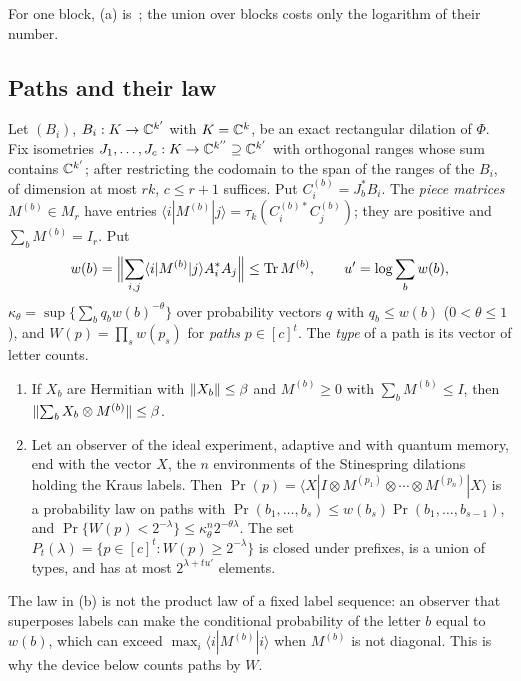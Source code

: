 For one block, (a) is~\cite[Lemma~A.4]{DouglasMghirbiB}; the union over blocks costs only the logarithm of their number.

\subsection{Paths and their law}

Let $(B_i)$, $B_i:K\to\mathbb C^{k'}$ with $K=\mathbb C^k$, be an exact rectangular dilation of $\Phi$. Fix isometries $J_1,\dots,J_c:K\to\mathbb C^{k''}\supseteq\mathbb C^{k'}$
with orthogonal ranges whose sum contains $\mathbb C^{k'}$; after restricting the codomain to the span of the ranges of the $B_i$, of
dimension at most $rk$, $c\le r+1$ suffices. Put $C^{(b)}_i=J_b^*B_i$. The \emph{piece matrices}
$M^{(b)}\in M_r$ have entries $\langle i|M^{(b)}|j\rangle=\tau_k(C^{(b)*}_iC^{(b)}_j)$; they are positive and $\sum_bM^{(b)}=I_r$. Put
\[
w(b)=\Bigl\lVert\sum_{i,j}\langle i|M^{(b)}|j\rangle A_i^*A_j\Bigr\rVert\le\operatorname{Tr} M^{(b)},\qquad u'=\log\sum_bw(b),
\]
$\kappa_\theta=\sup\{\sum_bq_bw(b)^{-\theta}\}$ over probability vectors $q$ with $q_b\le w(b)$ ($0<\theta\le1$), and $W(p)=\prod_sw(p_s)$ for
\emph{paths} $p\in[c]^t$. The \emph{type} of a path is its vector of letter counts.

\begin{lemma}\label{lem:pathlaw}
\begin{enumerate}[label=(\alph*),itemsep=1pt]
\item If $X_b$ are Hermitian with $\lVert X_b\rVert\le\beta$ and $M^{(b)}\ge0$ with $\sum_bM^{(b)}\le I$, then $\lVert \sum_bX_b\otimes M^{(b)}\rVert\le\beta$.
\item Let an observer of the ideal experiment, adaptive and with quantum memory, end with the vector $X$, the $n$ environments of the
Stinespring dilations holding the Kraus labels. Then $\Pr(p)=\langle X|I\otimes M^{(p_1)}\otimes\cdots\otimes M^{(p_n)}|X\rangle$ is a probability
law on paths with $\Pr(b_1,\dots,b_s)\le w(b_s)\Pr(b_1,\dots,b_{s-1})$, and $\Pr\{W(p)<2^{-\lambda}\}\le\kappa_\theta^n2^{-\theta\lambda}$. The set
$P_t(\lambda)=\{p\in[c]^t:W(p)\ge2^{-\lambda}\}$ is closed under prefixes, is a union of types, and has at most $2^{\lambda+tu'}$ elements.
\end{enumerate}
\end{lemma}

The law in (b) is not the product law of a fixed label sequence: an observer that superposes labels can make the conditional probability of
the letter $b$ equal to $w(b)$, which can exceed $\max_i\langle i|M^{(b)}|i\rangle$ when $M^{(b)}$ is not diagonal. This is why the device below
counts paths by $W$.

